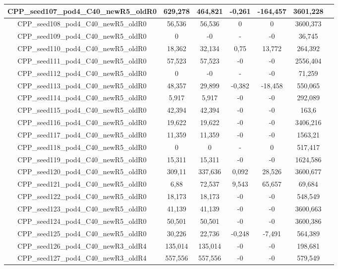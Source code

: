 \documentclass[a4paper]{article}
\begin{document}
\begin{center}
\begin{longtable}{ccccccc}
\hline
CPP\_seed107\_pod4\_C40\_newR5\_oldR0 & 629,278 & 464,821 & -0,261 & -164,457 & 3601,228\\
\hline
CPP\_seed108\_pod4\_C40\_newR5\_oldR0 & 56,536 & 56,536 & 0 & 0 & 3600,373\\
\hline
CPP\_seed109\_pod4\_C40\_newR5\_oldR0 & 0 & -0 & - & -0 & 36,745\\
\hline
CPP\_seed110\_pod4\_C40\_newR5\_oldR0 & 18,362 & 32,134 & 0,75 & 13,772 & 264,392\\
\hline
CPP\_seed111\_pod4\_C40\_newR5\_oldR0 & 57,523 & 57,523 & -0 & -0 & 2556,404\\
\hline
CPP\_seed112\_pod4\_C40\_newR5\_oldR0 & 0 & -0 & - & -0 & 71,259\\
\hline
CPP\_seed113\_pod4\_C40\_newR5\_oldR0 & 48,357 & 29,899 & -0,382 & -18,458 & 550,065\\
\hline
CPP\_seed114\_pod4\_C40\_newR5\_oldR0 & 5,917 & 5,917 & -0 & -0 & 292,089\\
\hline
CPP\_seed115\_pod4\_C40\_newR5\_oldR0 & 42,394 & 42,394 & -0 & -0 & 163,6\\
\hline
CPP\_seed116\_pod4\_C40\_newR5\_oldR0 & 19,622 & 19,622 & -0 & -0 & 3406,216\\
\hline
CPP\_seed117\_pod4\_C40\_newR5\_oldR0 & 11,359 & 11,359 & -0 & -0 & 1563,21\\
\hline
CPP\_seed118\_pod4\_C40\_newR5\_oldR0 & 0 & 0 & - & 0 & 517,417\\
\hline
CPP\_seed119\_pod4\_C40\_newR5\_oldR0 & 15,311 & 15,311 & -0 & -0 & 1624,586\\
\hline
CPP\_seed120\_pod4\_C40\_newR5\_oldR0 & 309,11 & 337,636 & 0,092 & 28,526 & 3600,677\\
\hline
CPP\_seed121\_pod4\_C40\_newR5\_oldR0 & 6,88 & 72,537 & 9,543 & 65,657 & 69,684\\
\hline
CPP\_seed122\_pod4\_C40\_newR5\_oldR0 & 18,173 & 18,173 & -0 & -0 & 548,549\\
\hline
CPP\_seed123\_pod4\_C40\_newR5\_oldR0 & 41,139 & 41,139 & -0 & -0 & 3600,663\\
\hline
CPP\_seed124\_pod4\_C40\_newR5\_oldR0 & 50,501 & 50,501 & -0 & -0 & 3600,386\\
\hline
CPP\_seed125\_pod4\_C40\_newR5\_oldR0 & 30,226 & 22,736 & -0,248 & -7,491 & 564,389\\
\hline
CPP\_seed126\_pod4\_C40\_newR3\_oldR4 & 135,014 & 135,014 & -0 & -0 & 198,681\\
\hline
CPP\_seed127\_pod4\_C40\_newR3\_oldR4 & 557,556 & 557,556 & -0 & -0 & 579,549\\

\end{longtable}
\end{center}
\end{document}
